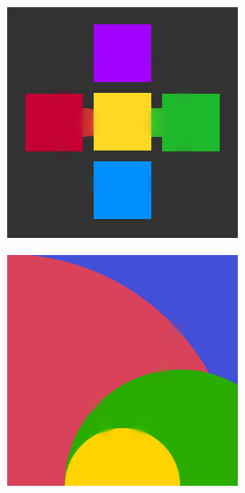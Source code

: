 \documentclass[xcolor=dvipsnames, xetex,serif]{beamer}
\numberwithin{equation}{section}
\begin{document}
\begin{frame}
\begin{figure}[H]
\begin{subfigure}{0.15\linewidth}
            \end{subfigure}
            \begin{subfigure}{0.15\linewidth}
                \centering
                \includegraphics[width=0.9\linewidth]{images/result_ex1/fixpoint04.png}
            \end{subfigure}
            \begin{subfigure}{0.15\linewidth}
                \centering
                \includegraphics[width=0.9\linewidth]{images/result_ex1/fixpoint05.png}

\end{subfigure}
\end{figure}
\end{frame}
\end{document}

